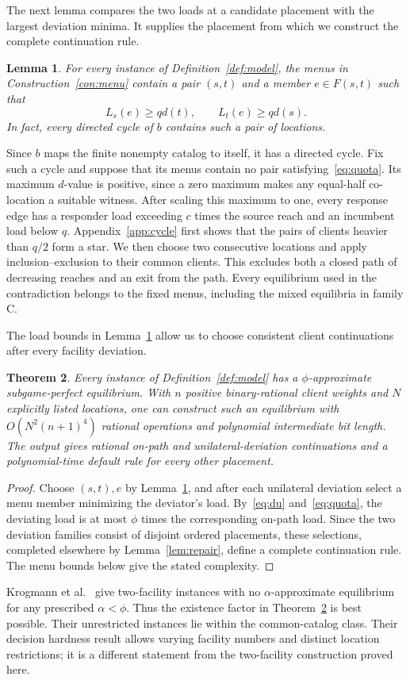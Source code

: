 \documentclass[11pt]{amsart}
\numberwithin{equation}{section}
\newtheorem{theorem}{Theorem}[section]
\newtheorem{lemma}[theorem]{Lemma}
\theoremstyle{definition}
\begin{document}
The next lemma compares the two loads at a candidate placement with the largest deviation minima. It supplies the placement from which we construct the complete continuation rule.
\begin{lemma}\label{lem:menu-cover}
For every instance of Definition~\ref{def:model}, the menus in Construction~\ref{con:menu} contain a pair $(s,t)$ and a member $e\in F(s,t)$ such that
\begin{equation}\label{eq:quota}
 L_s(e)\ge qd(t),\qquad L_t(e)\ge qd(s).
\end{equation}
In fact, every directed cycle of $b$ contains such a pair of locations.
\end{lemma}
Since $b$ maps the finite nonempty catalog to itself, it has a directed cycle. Fix such a cycle and suppose that its menus contain no pair satisfying~\eqref{eq:quota}. Its maximum $d$-value is positive, since a zero maximum makes any equal-half co-location a suitable witness. After scaling this maximum to one, every response edge has a responder load exceeding $c$ times the source reach and an incumbent load below $q$. Appendix~\ref{app:cycle} first shows that the pairs of clients heavier than $q/2$ form a star. We then choose two consecutive locations and apply inclusion--exclusion to their common clients. This excludes both a closed path of decreasing reaches and an exit from the path. Every equilibrium used in the contradiction belongs to the fixed menus, including the mixed equilibria in family C.

The load bounds in Lemma~\ref{lem:menu-cover} allow us to choose consistent client continuations after every facility deviation.
\begin{theorem}\label{thm:main}
Every instance of Definition~\ref{def:model} has a $\phi$-approximate subgame-perfect equilibrium. With $n$ positive binary-rational client weights and $N$ explicitly listed locations, one can construct such an equilibrium with $O(N^2(n+1)^4)$ rational operations and polynomial intermediate bit length. The output gives rational on-path and unilateral-deviation continuations and a polynomial-time default rule for every other placement.
\end{theorem}
\begin{proof}
Choose $(s,t),e$ by Lemma~\ref{lem:menu-cover}, and after each unilateral deviation select a menu member minimizing the deviator's load. By~\eqref{eq:du} and~\eqref{eq:quota}, the deviating load is at most $\phi$ times the corresponding on-path load. Since the two deviation families consist of disjoint ordered placements, these selections, completed elsewhere by Lemma~\ref{lem:repair}, define a complete continuation rule. The menu bounds below give the stated complexity.
\end{proof}
Krogmann et al.~\cite[Theorem~5]{krogmann2024} give two-facility instances with no $\alpha$-approximate equilibrium for any prescribed $\alpha<\phi$. Thus the existence factor in Theorem~\ref{thm:main} is best possible. Their unrestricted instances lie within the common-catalog class. Their decision hardness result allows varying facility numbers and distinct location restrictions; it is a different statement from the two-facility construction proved here.
\end{document}
